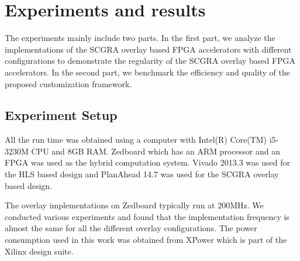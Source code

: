\section{Experiments and results} \label{sec:result}
The experiments mainly include two parts. In the first part, we 
analyze the implementations of the SCGRA overlay based FPGA accelerators with 
different configurations to demonstrate the regularity of the 
SCGRA overlay based FPGA accelerators. In the second part, we benchmark the 
efficiency and quality of the proposed customization framework.

\subsection{Experiment Setup}
All the run time was obtained using a computer with Intel(R) Core(TM) 
i5-3230M CPU and 8GB RAM. Zedboard which has an ARM processor and 
an FPGA was used as the hybrid computation system. Vivado 2013.3 was 
used for the HLS based design and PlanAhead 14.7 was used for the SCGRA overlay based 
design. 

The overlay implementations on Zedboard typically run at 200MHz. We conducted various 
experiments and found that the implementation frequency is almost the same for all the 
different overlay configurations. The power consumption used in this work was 
obtained from XPower which is part of the Xilinx design suite.

